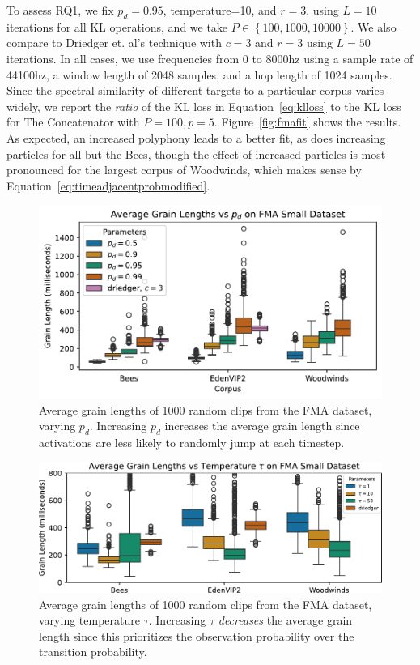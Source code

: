 \documentclass{article}
\begin{document}
To assess RQ1, we fix $p_d=0.95$, temperature=10, and $r=3$, using $L=10$ iterations for all KL operations, and we take $P \in \left\{ 100, 1000, 10000 \right\}$.  We also compare to Driedger et. al's technique with $c=3$ and $r=3$ using $L=50$ iterations.  In all cases, we use frequencies from $0$ to $8000$hz using a sample rate of 44100hz, a window length of 2048 samples, and a hop length of 1024 samples.  Since the spectral similarity of different targets to a particular corpus varies widely, we report the {\em ratio} of the KL loss in Equation~\ref{eq:klloss} to the KL loss for The Concatenator with $P=100, p=5$.  Figure~\ref{fig:fmafit} shows the results.  As expected, an increased polyphony leads to a better fit, as does increasing particles for all but the Bees, though the effect of increased particles is most pronounced for the largest corpus of Woodwinds, which makes sense by Equation~\ref{eq:timeadjacentprobmodified}.


\begin{figure}
    \centering
    \includegraphics[width=\columnwidth]{figs/pdGrainLengths.pdf}
    \caption{Average grain lengths of 1000 random clips from the FMA dataset, varying $p_d$.  Increasing $p_d$ increases the average grain length since activations are less likely to randomly jump at each timestep.}
    \label{fig:pdGrainLengths}
\end{figure}


\begin{figure}
    \centering
    \includegraphics[width=\columnwidth]{figs/tempGrainLengths.pdf}
    \caption{Average grain lengths of 1000 random clips from the FMA dataset, varying temperature $\tau$.  Increasing $\tau$ {\em decreases} the average grain length since this prioritizes the observation probability over the transition probability.}
    \label{fig:tempGrainLengths}
\end{figure}
\end{document}
